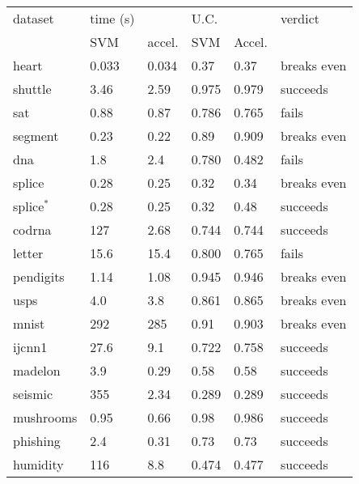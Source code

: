 \begin{tabular}{|l|ll|ll|l|}
	\hline
dataset & time (s) & & U.C. & & verdict \\
 & SVM & accel. & SVM & Accel. & \\
	\hline
heart & 0.033 & 0.034 & 0.37 & 0.37 & breaks even \\
shuttle & 3.46 & 2.59 & 0.975 & 0.979 & succeeds \\
	sat & 0.88 & 0.87 & 0.786 & 0.765 & fails \\
segment & 0.23 & 0.22 & 0.89 & 0.909 & breaks even \\
	dna & 1.8 & 2.4 & 0.780 & 0.482 & fails \\
	splice & 0.28 & 0.25 & 0.32 & 0.34 & breaks even \\
	splice$^*$
		& 0.28 & 0.25 & 0.32 & 0.48 & succeeds \\
	codrna & 127 & 2.68 & 0.744 & 0.744 & succeeds \\
	letter & 15.6 & 15.4 & 0.800 & 0.765 & fails \\
	pendigits & 1.14 & 1.08 & 0.945 & 0.946 & breaks even \\
	usps & 4.0 & 3.8 & 0.861 & 0.865 & breaks even \\
	mnist & 292 & 285 & 0.91 & 0.903 & breaks even \\
	ijcnn1 & 27.6 & 9.1 & 0.722 & 0.758 & succeeds \\
	madelon & 3.9 & 0.29 & 0.58 & 0.58 & succeeds \\
	seismic & 355 & 2.34 & 0.289 & 0.289 & succeeds \\
	mushrooms & 0.95 & 0.66 & 0.98 & 0.986 & succeeds \\
	phishing & 2.4 & 0.31 & 0.73 & 0.73 & succeeds \\
	humidity & 116 & 8.8 & 0.474 & 0.477 & succeeds \\
	\hline
\end{tabular}
